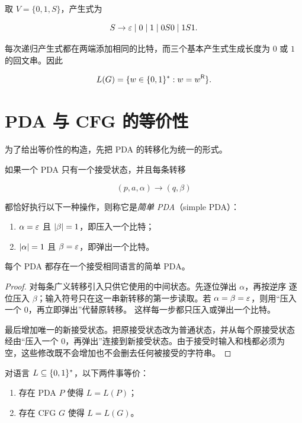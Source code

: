 \begin{example}[回文串文法]
  \label{ex:cfg-palindromes}
  取 $V=\{0,1,S\}$，产生式为

  \[
    S\to\varepsilon
    \mid 0
    \mid 1
    \mid 0S0
    \mid 1S1.
  \]

  每次递归产生式都在两端添加相同的比特，而三个基本产生式生成长度为
  $0$ 或 $1$ 的回文串。因此

  \[
    L(G)=\{w\in\{0,1\}^{*}:w=w^{\mathsf R}\}.
  \]
\end{example}

\section{PDA 与 CFG 的等价性}

为了给出等价性的构造，先把 PDA 的转移化为统一的形式。

\begin{definition}[简单 PDA]
  \label{def:simple-pda}
  如果一个 PDA 只有一个接受状态，并且每条转移

  \[
    (p,a,\alpha)\longrightarrow(q,\beta)
  \]

  都恰好执行以下一种操作，则称它是\emph{简单 PDA}（simple PDA）：

  \begin{enumerate}[label=\arabic*.]
    \item $\alpha=\varepsilon$ 且 $\lvert \beta\rvert=1$，即压入一个比特；
    \item $\lvert \alpha\rvert=1$ 且 $\beta=\varepsilon$，即弹出一个比特。
  \end{enumerate}
\end{definition}

\begin{lemma}
  \label{lem:pda-to-simple-pda}
  每个 PDA 都存在一个接受相同语言的简单 PDA。
\end{lemma}

\begin{proof}
  对每条广义转移引入只供它使用的中间状态。先逐位弹出 $\alpha$，再按逆序
  逐位压入 $\beta$；输入符号只在这一串新转移的第一步读取。若
  $\alpha=\beta=\varepsilon$，则用“压入一个 $0$，再立即弹出”代替原转移。
  这样每一步都只压入或弹出一个比特。

  最后增加唯一的新接受状态。把原接受状态改为普通状态，并从每个原接受状态
  经由“压入一个 $0$，再弹出”连接到新接受状态。由于接受时输入和栈都必须为
  空，这些修改既不会增加也不会删去任何被接受的字符串。
\end{proof}

\begin{theorem}
  \label{thm:pda-cfg-equivalence}
  对语言 $L\subseteq\{0,1\}^{*}$，以下两件事等价：

  \begin{enumerate}[label=\arabic*.]
    \item 存在 PDA $P$ 使得 $L=L(P)$；
    \item 存在 CFG $G$ 使得 $L=L(G)$。
  \end{enumerate}
\end{theorem}


